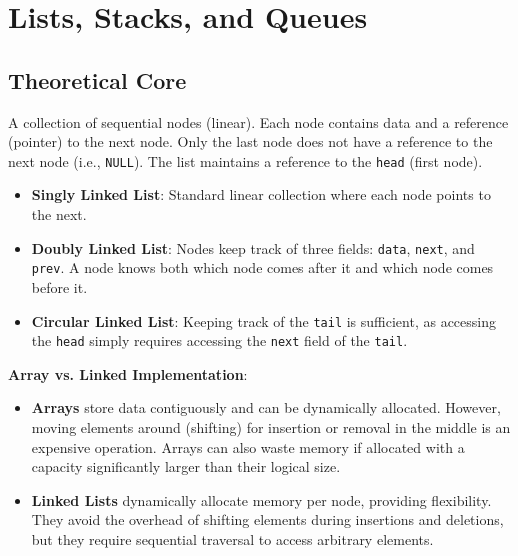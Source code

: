\chapter{Lists, Stacks, and Queues}

\section{Theoretical Core}

\begin{definition}
A collection of sequential nodes (linear). Each node contains data and a reference (pointer) to the next node. Only the last node does not have a reference to the next node (i.e., \texttt{NULL}). The list maintains a reference to the \texttt{head} (first node).
\end{definition}

\begin{itemize}
    \item \textbf{Singly Linked List}: Standard linear collection where each node points to the next.
    \item \textbf{Doubly Linked List}: Nodes keep track of three fields: \texttt{data}, \texttt{next}, and \texttt{prev}. A node knows both which node comes after it and which node comes before it.
    \item \textbf{Circular Linked List}: Keeping track of the \texttt{tail} is sufficient, as accessing the \texttt{head} simply requires accessing the \texttt{next} field of the \texttt{tail}.
\end{itemize}

\begin{remark}
\textbf{Array vs. Linked Implementation}:
\begin{itemize}
    \item \textbf{Arrays} store data contiguously and can be dynamically allocated. However, moving elements around (shifting) for insertion or removal in the middle is an expensive operation. Arrays can also waste memory if allocated with a capacity significantly larger than their logical size.
    \item \textbf{Linked Lists} dynamically allocate memory per node, providing flexibility. They avoid the overhead of shifting elements during insertions and deletions, but they require sequential traversal to access arbitrary elements.
\end{itemize}
\end{remark}

